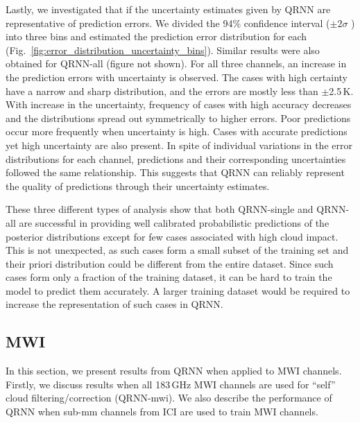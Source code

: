 \documentclass[amt, manuscript]{copernicus}
\begin{document}
Lastly, we investigated that if the uncertainty estimates given by QRNN are representative of prediction errors.  We divided the 94\% confidence interval ($\pm2\sigma$ ) into three bins and estimated the prediction error distribution for each (Fig.~\ref{fig:error_distribution_uncertainty_bins}). Similar results were also obtained for QRNN-all (figure not shown). For all three channels, an increase in the prediction errors with uncertainty is observed. The cases with high certainty have a narrow and sharp distribution, and the errors are mostly less than $\pm$2.5\,K. With increase in the uncertainty, frequency of cases with high accuracy decreases and the distributions spread out symmetrically to higher errors. Poor predictions occur more frequently when uncertainty is high. Cases with accurate predictions yet high uncertainty are also present. In spite of individual variations in the error distributions for each channel, predictions and their corresponding uncertainties followed the same relationship. This suggests that QRNN can reliably represent the quality of predictions through their uncertainty estimates.

These three different types of analysis show that both QRNN-single and QRNN-all are successful in providing well calibrated probabilistic predictions of the posterior distributions except for few cases associated with high cloud impact. This is not unexpected, as such cases form a small subset of the training set and their priori distribution could be different from the entire dataset. Since such cases form only a fraction of the training dataset, it can be hard to train the model to predict them accurately. A larger training dataset would be required to increase the representation of such cases in QRNN.


\subsection{MWI}
%
In this section, we present results from QRNN when applied to MWI channels. Firstly, we discuss results when all 183\,GHz MWI channels are used for ``self'' cloud filtering/correction (QRNN-mwi). We also describe the performance of QRNN when sub-mm channels from ICI are used to train MWI channels.
\end{document}

